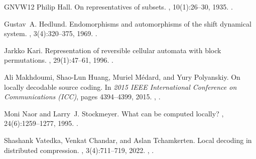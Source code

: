 \documentclass[11pt]{article}
\theoremstyle{definition}
\theoremstyle{remark}
\begin{document}
\begin{thebibliography}{GNVW12}
Philip Hall.
\newblock On representatives of subsets.
, 10(1):26--30, 1935.
\newblock \href {https://doi.org/10.1112/jlms/s1-10.37.26}
  {}.

Gustav~A. Hedlund.
\newblock Endomorphisms and automorphisms of the shift dynamical system.
, 3(4):320--375, 1969.
\newblock \href {https://doi.org/10.1007/BF01691062}
  {}.

Jarkko Kari.
\newblock Representation of reversible cellular automata with block
  permutations.
, 29(1):47--61, 1996.
\newblock \href {https://doi.org/10.1007/BF01201814}
  {}.

Ali Makhdoumi, Shao-Lun Huang, Muriel M{\'e}dard, and Yury Polyanskiy.
\newblock On locally decodable source coding.
\newblock In {\em 2015 IEEE International Conference on Communications (ICC)},
  pages 4394--4399, 2015.
\newblock \href {https://arxiv.org/abs/1308.5239} {},
  \href {https://doi.org/10.1109/ICC.2015.7249014}
  {}.

Moni Naor and Larry~J. Stockmeyer.
\newblock What can be computed locally?
, 24(6):1259--1277, 1995.
\newblock \href {https://doi.org/10.1137/S0097539793254571}
  {}.

Shashank Vatedka, Venkat Chandar, and Aslan Tchamkerten.
\newblock Local decoding in distributed compression.
,
  3(4):711--719, 2022.
\newblock \href {https://arxiv.org/abs/2204.07518} {},
  \href {https://doi.org/10.1109/JSAIT.2023.3240187}
  {}.

\end{thebibliography}
\endgroup
\end{document}
